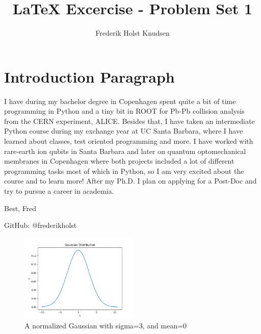 \documentclass[11pt]{article}
\title{LaTeX Excercise - Problem Set 1}
\author{Frederik Holst Knudsen}
\begin{document}
\maketitle

\section{Introduction Paragraph}
I have during my bachelor degree in Copenhagen spent quite a bit of time programming in Python and a tiny bit in ROOT for Pb-Pb collision analysis from the CERN experiment, ALICE. Besides that, I have taken an intermediate Python course during my exchange year at UC Santa Barbara, where I have learned about classes, test oriented programming and more. I have worked with rare-earth ion qubits in Santa Barbara and later on quantum optomechanical membranes in Copenhagen where both projects included a lot of different programming tasks most of which in Python, so I am very excited about the course and to learn more! After my Ph.D. I plan on applying for a Post-Doc and try to pursue a career in academia. 

Best, 
Fred

GitHub: @frederikholst

\label{sec:intro}

\begin{figure}[b!]
\centering
\includegraphics[width=0.5\textwidth]{gaussian.png}
\caption{ \label{fig:example} A normalized Gaussian with sigma=3, and mean=0}
\end{figure}
\end{document}

